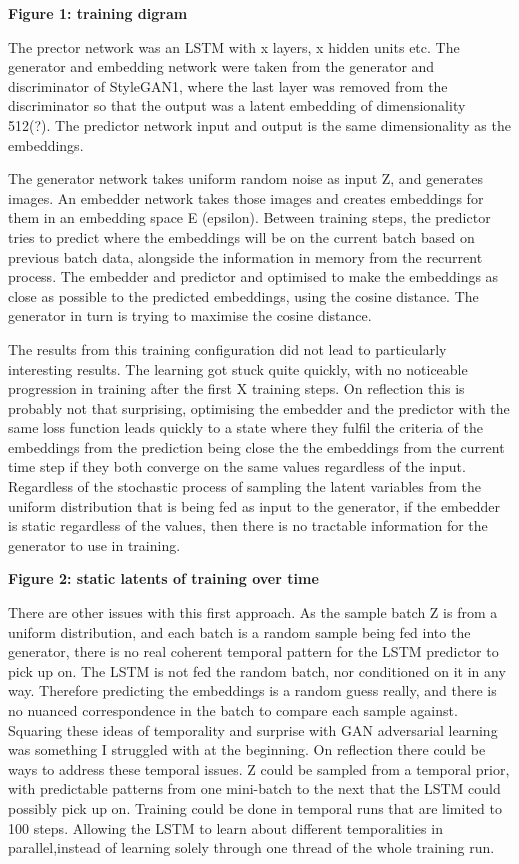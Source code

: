 \textbf{Figure 1: training digram}

The prector network was an LSTM with x layers, x hidden units etc. The generator and embedding network were taken from the generator and discriminator of StyleGAN1, where the last layer was removed from the discriminator so that the output was a latent embedding of dimensionality 512(?). 
The predictor network input and output is the same dimensionality as the embeddings.

The generator network takes uniform random noise as input Z, and generates images. 
An embedder network takes those images and creates embeddings for them in an embedding space E (epsilon). 
Between training steps, the predictor tries to predict where the embeddings will be on the current batch based on previous batch data, alongside the information in memory from the recurrent process. 
The embedder and predictor and optimised to make the embeddings as close as possible to the predicted embeddings, using the cosine distance. 
The generator in turn is trying to maximise the cosine distance.

The results from this training configuration did not lead to particularly interesting results. 
The learning got stuck quite quickly, with no noticeable progression in training after the first X training steps. 
On reflection this is probably not that surprising, optimising the embedder and the predictor with the same loss function leads quickly to a state where they fulfil the criteria of the embeddings from the prediction being close the the embeddings from the current time step if they both converge on the same values regardless of the input.
Regardless of the stochastic process of sampling the latent variables from the uniform distribution that is being fed as input to the generator, if the embedder is static regardless of the values, then there is no tractable information for the generator to use in training.

\textbf{Figure 2: static latents of training over time }

There are other issues with this first approach. 
As the sample batch Z is from a uniform distribution, and each batch is a random sample being fed into the generator, there is no real coherent temporal pattern for the LSTM predictor to pick up on. 
The LSTM is not fed the random batch, nor conditioned on it in any way. Therefore predicting the embeddings is a random guess really, and there is no nuanced correspondence in the batch to compare each sample against. 
Squaring these ideas of temporality and surprise with GAN adversarial learning was something I struggled with at the beginning. 
On reflection there could be ways to address these temporal issues. Z could be sampled from a temporal prior, with predictable patterns from one mini-batch to the next that the LSTM could possibly pick up on. 
Training could be done in temporal runs that are limited to 100 steps. 
Allowing the LSTM to learn about different temporalities in parallel,instead of learning solely through one thread of the whole training run. 

